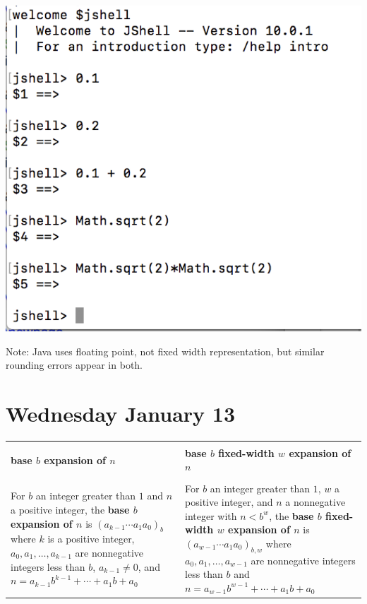\documentclass[12pt, oneside]{article}
\begin{document}
\vfill

\includegraphics{../Resources/images/ArithmeticDemo.png}

Note: Java uses floating point, not fixed width representation, but similar rounding errors appear in both.
\newpage
\section*{Wednesday January 13}

\begin{center}
\begin{tabular}{|p{3.7in}|p{3.7in}|}
\hline 
&   \\
{\bf base $b$ expansion of $n$}  & {\bf base $b$ fixed-width $w$ expansion of $n$}  \\
& \\
\hline  
For $b$ an integer greater than $1$ and $n$ a positive integer, 
the {\bf base $b$ expansion of $n$}  is $(a_{k-1} \cdots a_1 a_0)_b$
where $k$ is a positive integer, $a_0, a_1, \ldots, a_{k-1}$ are nonnegative integers less than $b$, $a_{k-1} \neq  0$, and $n =  a_{k-1} b^{k-1} + \cdots + a_1b + a_0$
& 
For $b$ an integer greater than $1$, $w$ a positive integer, and $n$ a nonnegative integer
with $n <  b^w$, the {\bf base $b$ fixed-width $w$ expansion of $n$}  is
$(a_{w-1} \cdots a_1 a_0)_{b,w}$
where  $a_0, a_1, \ldots, a_{w-1}$ are nonnegative integers less than $b$ and 
$n =  a_{w-1} b^{w-1} + \cdots + a_1b + a_0$\\
\hline
\end{tabular}
\end{center}
\vfill
\end{document}
